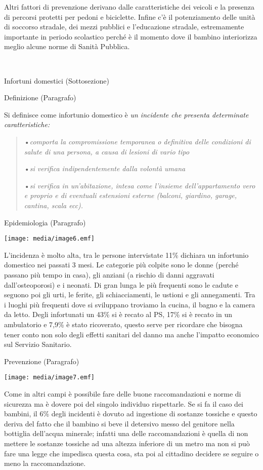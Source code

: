 \documentclass[]{article}
\begin{document}
Altri fattori di prevenzione derivano dalle caratteristiche dei veicoli
e la presenza di percorsi protetti per pedoni e biciclette. Infine c'è
il potenziamento delle unità di soccorso stradale, dei mezzi pubblici e
l'educazione stradale, estremamente importante in periodo scolastico
perché è il momento dove il bambino interiorizza meglio alcune norme di
Sanità Pubblica.

~

Infortuni domestici (Sottosezione)

Definizione (Paragrafo)

Si definisce come infortunio domestico è \emph{un incidente che presenta
determinate caratteristiche: }

\begin{quote}
•\emph{comporta la compromissione temporanea o definitiva delle
condizioni di salute di una persona, a causa di lesioni di vario tipo}

•\emph{si verifica indipendentemente dalla volontà umana}

•\emph{si verifica in un'abitazione, intesa come l'insieme
dell'appartamento vero e proprio e di eventuali estensioni esterne
(balconi, giardino, garage, cantina, scala ecc).}
\end{quote}

Epidemiologia (Paragrafo)

\texttt{[image: media/image6.emf]}

L'incidenza è molto alta, tra le persone intervistate 11\% dichiara un
infortunio domestico nei passati 3 mesi. Le categorie più colpite sono
le donne (perché passano più tempo in casa), gli anziani (a rischio di
danni aggravati dall'osteoporosi) e i neonati. Di gran lunga le più
frequenti sono le cadute e seguono poi gli urti, le ferite, gli
schiacciamenti, le ustioni e gli annegamenti. Tra i luoghi più frequenti
dove si sviluppano troviamo la cucina, il bagno e la camera da letto.
Degli infortunati un 43\% si è recato al PS, 17\% si è recato in un
ambulatorio e 7,9\% è stato ricoverato, questo serve per ricordare che
bisogna tener conto non solo degli effetti sanitari del danno ma anche
l'impatto economico sul Servizio Sanitario.

Prevenzione (Paragrafo)

\texttt{[image: media/image7.emf]}

Come in altri campi è possibile fare delle buone raccomandazioni e norme
di sicurezza ma è dovere poi del singolo individuo rispettarle. Se si fa
il caso dei bambini, il 6\% degli incidenti è dovuto ad ingestione di
sostanze tossiche e questo deriva del fatto che il bambino si beve il
detersivo messo del genitore nella bottiglia dell'acqua minerale;
infatti una delle raccomandazioni è quella di non mettere le sostanze
tossiche ad una altezza inferiore di un metro ma non si può fare una
legge che impedisca questa cosa, sta poi al cittadino decidere se
seguire o meno la raccomandazione.
\end{document}
